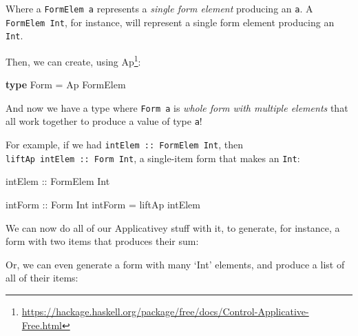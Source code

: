 \documentclass[]{article}
\newenvironment{Shaded}{}{}
\newcommand{\CommentTok}[1]{\textcolor[rgb]{0.38,0.63,0.69}{\textit{#1}}}
\newcommand{\DataTypeTok}[1]{\textcolor[rgb]{0.56,0.13,0.00}{#1}}
\newcommand{\KeywordTok}[1]{\textcolor[rgb]{0.00,0.44,0.13}{\textbf{#1}}}
\newcommand{\NormalTok}[1]{#1}
\newcommand{\OperatorTok}[1]{\textcolor[rgb]{0.40,0.40,0.40}{#1}}
\newcommand{\OtherTok}[1]{\textcolor[rgb]{0.00,0.44,0.13}{#1}}
\renewcommand{\href}[2]{#2\footnote{\url{#1}}}
\begin{document}
Where a \texttt{FormElem\ a} represents a \emph{single form element} producing
an \texttt{a}. A \texttt{FormElem\ Int}, for instance, will represent a single
form element producing an \texttt{Int}.

Then, we can create, using
\href{https://hackage.haskell.org/package/free/docs/Control-Applicative-Free.html}{Ap}:

\begin{Shaded}
\begin{Highlighting}[]
\KeywordTok{type} \DataTypeTok{Form} \OtherTok{=} \DataTypeTok{Ap} \DataTypeTok{FormElem}
\end{Highlighting}
\end{Shaded}

And now we have a type where \texttt{Form\ a} is \emph{whole form with multiple
elements} that all work together to produce a value of type \texttt{a}!

For example, if we had \texttt{intElem\ ::\ FormElem\ Int}, then
\texttt{liftAp\ intElem\ ::\ Form\ Int}, a single-item form that makes an
\texttt{Int}:

\begin{Shaded}
\begin{Highlighting}[]
\OtherTok{intElem ::} \DataTypeTok{FormElem} \DataTypeTok{Int}

\OtherTok{intForm ::} \DataTypeTok{Form} \DataTypeTok{Int}
\NormalTok{intForm }\OtherTok{=}\NormalTok{ liftAp intElem}
\end{Highlighting}
\end{Shaded}

We can now do all of our Applicativey stuff with it, to generate, for instance,
a form with two items that produces their sum:

\begin{Shaded}
\end{Shaded}

Or, we can even generate a form with many `Int' elements, and produce a list of
all of their items:
\end{document}
